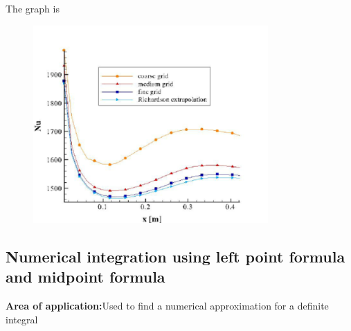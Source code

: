 \documentclass{article}
\begin{document}
The graph is
\begin{figure}[H]
	\includegraphics[width=0.8\textwidth, height=0.6\textwidth]{rich-extrap.png}
\end{figure}
	\subsection{Numerical integration using left point formula and midpoint formula}
{\bf Area of application:}Used to find a numerical approximation for a definite integral
\end{document}
